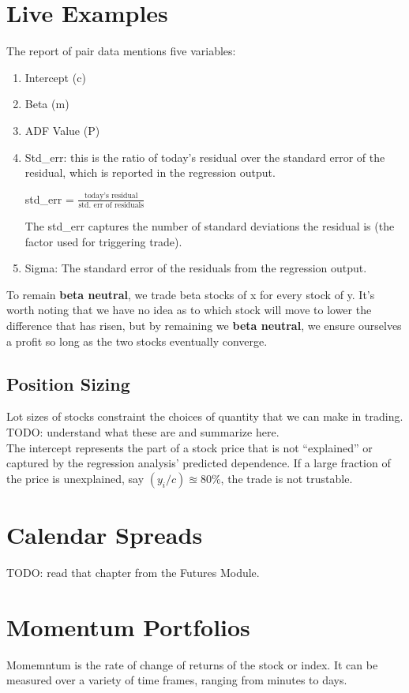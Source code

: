 \documentclass{article}
\begin{document}
\section{Live Examples}
The report of pair data mentions five variables:
\begin{enumerate}
    \item Intercept (c)
    \item Beta (m)
    \item ADF Value (P)
    \item Std\_err: this is the ratio of today's residual over the standard 
    error of the residual, which is reported in the regression output.
    \begin{center}
        std\_err = $\frac{\text{today's residual}}{\text{std. err of residuals}}$
    \end{center}
    The std\_err captures the number of standard deviations the residual is (the factor used for triggering trade).
    \item Sigma: The standard error of the residuals from the regression output.
\end{enumerate}
To remain \textbf{beta neutral}, we trade beta stocks of x for every stock of y.
It's worth noting that we have no idea as to which stock will move to lower the
difference that has risen, but by remaining we \textbf{beta neutral}, we ensure
ourselves a profit so long as the two stocks eventually converge.
\begin{center}
\end{center}
\subsection{Position Sizing}
Lot sizes of stocks constraint the choices of quantity that we can make in trading. TODO: understand what these are and summarize here.\\
The intercept represents the part of a stock price that is not ``explained'' or
captured by the regression analysis' predicted dependence. If a large fraction
of the price is unexplained, say $(y_i/c) \approxeq 80\%$, the trade is not trustable.
\section{Calendar Spreads}
TODO: read that chapter from the Futures Module.
\section{Momentum Portfolios}
Momemntum is the rate of change of returns of the stock or index. It can be
measured over a variety of time frames, ranging from minutes to days.
\end{document}
